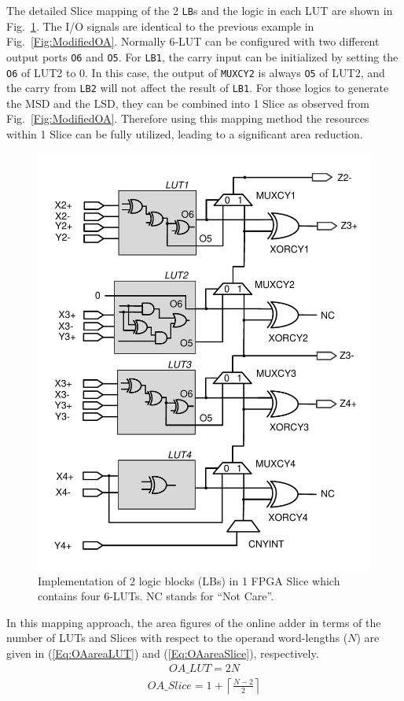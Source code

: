 \documentclass[conference]{IEEEtran}
\begin{document}
The detailed Slice mapping of the 2 \texttt{LB}s and the logic in each LUT are shown in Fig.~\ref{Fig:SliceNew}. The I/O signals are identical to the previous example in Fig.~\ref{Fig:ModifiedOA}. Normally 6-LUT can be configured with two different output ports \texttt{O6} and \texttt{O5}. For \texttt{LB1}, the carry input can be initialized by setting the \texttt{O6} of LUT2 to 0. In this case, the output of \texttt{MUXCY2} is always \texttt{O5} of LUT2, and the carry from \texttt{LB2} will not affect the result of \texttt{LB1}. For those logics to generate the MSD and the LSD, they can be combined into 1 Slice as observed from Fig.~\ref{Fig:ModifiedOA}. Therefore using this mapping method the resources within 1 Slice can be fully utilized, leading to a significant area reduction.

\begin{figure}[tbp]
	\centering
	\includegraphics[width=.5\textwidth]{./Figures/SDadder_FastCarry_New2.pdf}
	\caption{Implementation of 2 logic blocks (LBs) in 1 FPGA Slice which contains four 6-LUTs. NC stands for ``Not Care''.}
	\label{Fig:SliceNew}
\end{figure}

In this mapping approach, the area figures of the online adder in terms of the number of LUTs and Slices with respect to the operand word-lengths ($N$) are given in (\ref{Eq:OAareaLUT}) and (\ref{Eq:OAareaSlice}), respectively.
\begin{eqnarray}\label{Eq:OAareaLUT}
	OA\_LUT = 2N
\end{eqnarray}
%
\begin{eqnarray}\label{Eq:OAareaSlice}
	OA\_Slice = 1+\left\lceil\frac{N-2}{2}\right\rceil
\end{eqnarray}
\end{document}
